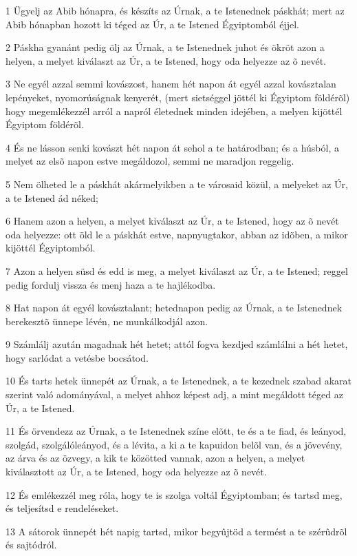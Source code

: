 \par 1 Ügyelj az Abib hónapra, és készíts az Úrnak, a te Istenednek páskhát; mert az Abib hónapban hozott ki téged az Úr, a te Istened Égyiptomból éjjel.
\par 2 Páskha gyanánt pedig ölj az Úrnak, a te Istenednek juhot és ökröt azon a helyen, a melyet kiválaszt az Úr, a te Istened, hogy oda helyezze az õ nevét.
\par 3 Ne egyél azzal semmi kovászost, hanem hét napon át egyél azzal kovásztalan lepényeket, nyomorúságnak kenyerét, (mert sietséggel jöttél ki Égyiptom földérõl) hogy megemlékezzél arról a napról életednek minden idejében, a melyen kijöttél Égyiptom földérõl.
\par 4 És ne lásson senki kovászt hét napon át sehol a te határodban; és a húsból, a melyet az elsõ napon estve megáldozol, semmi ne maradjon reggelig.
\par 5 Nem ölheted le a páskhát akármelyikben a te városaid közül, a melyeket az Úr, a te Istened ád néked;
\par 6 Hanem azon a helyen, a melyet kiválaszt az Úr, a te Istened, hogy az õ nevét oda helyezze: ott öld le a páskhát estve, napnyugtakor, abban az idõben, a mikor kijöttél Égyiptomból.
\par 7 Azon a helyen süsd és edd is meg, a melyet kiválaszt az Úr, a te Istened; reggel pedig fordulj vissza és menj haza a te hajlékodba.
\par 8 Hat napon át egyél kovásztalant; hetednapon pedig az Úrnak, a te Istenednek berekesztõ ünnepe lévén, ne munkálkodjál azon.
\par 9 Számlálj azután magadnak hét hetet; attól fogva kezdjed számlálni a hét hetet, hogy sarlódat a vetésbe bocsátod.
\par 10 És tarts hetek ünnepét az Úrnak, a te Istenednek, a te kezednek szabad akarat szerint való adományával, a melyet ahhoz képest adj, a mint megáldott téged az Úr, a te Istened.
\par 11 És örvendezz az Úrnak, a te Istenednek színe elõtt, te és a te fiad, és leányod, szolgád, szolgálóleányod, és a lévita, a ki a te kapuidon belõl van, és a jövevény, az árva és az özvegy, a kik te közötted vannak, azon a helyen, a melyet kiválasztott az Úr, a te Istened, hogy oda helyezze az õ nevét.
\par 12 És emlékezzél meg róla, hogy te is szolga voltál Égyiptomban; és tartsd meg, és teljesítsd e rendeléseket.
\par 13 A sátorok ünnepét hét napig tartsd, mikor begyûjtöd a termést a te szérûdrõl és sajtódról.

